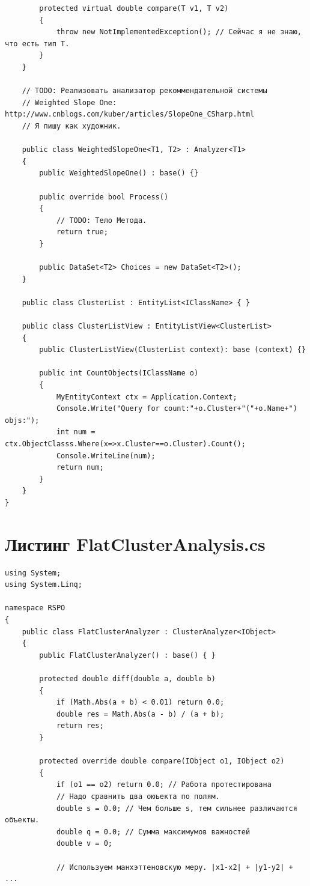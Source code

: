 \documentclass[a4paper,14pt,openany,final]{extreport} %
\begin{document}
{\begin{verbatim}
        protected virtual double compare(T v1, T v2)
        {
            throw new NotImplementedException(); // Сейчас я не знаю, что есть тип T.
        }
    }

    // TODO: Реализовать анализатор рекоммендательной системы
    // Weighted Slope One: http://www.cnblogs.com/kuber/articles/SlopeOne_CSharp.html
    // Я пишу как художник.

    public class WeightedSlopeOne<T1, T2> : Analyzer<T1>
    {
        public WeightedSlopeOne() : base() {}

        public override bool Process()
        {
            // TODO: Тело Метода.
            return true;
        }

        public DataSet<T2> Choices = new DataSet<T2>();
    }

    public class ClusterList : EntityList<IClassName> { }

    public class ClusterListView : EntityListView<ClusterList>
    {
        public ClusterListView(ClusterList context): base (context) {}

        public int CountObjects(IClassName o)
        {
            MyEntityContext ctx = Application.Context;
            Console.Write("Query for count:"+o.Cluster+"("+o.Name+") objs:");
            int num = ctx.ObjectClasss.Where(x=>x.Cluster==o.Cluster).Count();
            Console.WriteLine(num);
            return num;
        }
    }
}
\end{verbatim}
\chapter{Листинг FlatClusterAnalysis.cs}
\begin{verbatim}
using System;
using System.Linq;

namespace RSPO
{
	public class FlatClusterAnalyzer : ClusterAnalyzer<IObject>
	{
		public FlatClusterAnalyzer() : base() { }

		protected double diff(double a, double b)
		{
			if (Math.Abs(a + b) < 0.01) return 0.0;
			double res = Math.Abs(a - b) / (a + b);
			return res;
		}

		protected override double compare(IObject o1, IObject o2)
		{
			if (o1 == o2) return 0.0; // Работа протестирована
			// Надо сравнить два оюъекта по полям.
			double s = 0.0; // Чем больше s, тем сильнее различаются объекты.
			double q = 0.0; // Сумма максимумов важностей
			double v = 0;

			// Используем манхэттеновскую меру. |x1-x2| + |y1-y2| + ...


\end{verbatim}}
\end{document}
